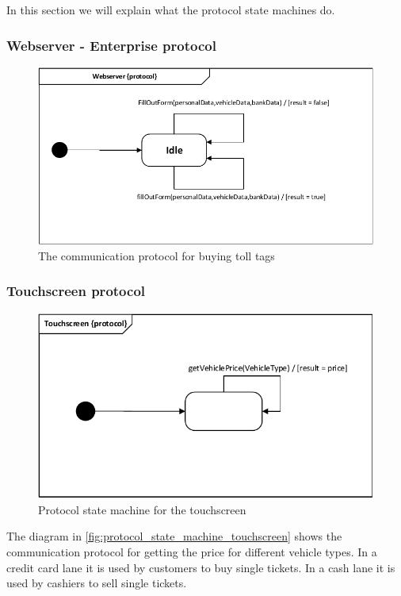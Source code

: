 In this section we will explain what the protocol state machines do.
\subsubsection*{Webserver - Enterprise protocol}
\begin{figure}[H]
\centering
\includegraphics[width=0.7\linewidth]{img/behaviour_state_machines/protocol_state_machines/protocol_state_machine_webserver_to_enterprise}
\caption{The communication protocol for buying toll tags}
\label{fig:protocol_state_machine_webserver_to_enterprise}
\end{figure}

\subsubsection*{Touchscreen protocol}
\begin{figure}[H]
\centering
\includegraphics[width=0.7\linewidth]{img/behaviour_state_machines/protocol_state_machines/protocol_state_machine_touchscreen}
\caption{Protocol state machine for the touchscreen}
\label{fig:protocol_state_machine_touchscreen}
\end{figure}
The diagram in \autoref{fig:protocol_state_machine_touchscreen} shows the communication protocol for getting the price for different vehicle types. In a credit card lane it is used by customers to buy single tickets. In a cash lane it is used by cashiers to sell single tickets.

